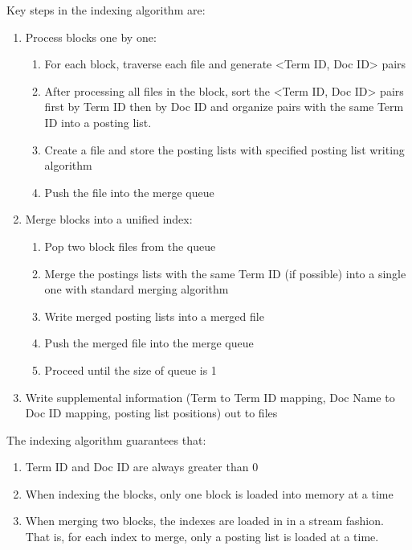\documentclass{article}
\newenvironment{enumeratenumeric}{\begin{enumerate}[1.] }{\end{enumerate}}
\begin{document}
Key steps in the indexing algorithm are:
\begin{enumeratenumeric}
  \item Process blocks one by one:
  \begin{enumeratenumeric}
    \item For each block, traverse each file and generate <Term ID, Doc ID>
    pairs
    
    \item After processing all files in the block, sort the <Term ID, Doc ID>
    pairs first by Term ID then by Doc ID and organize pairs with the same
    Term ID into a posting list.
    
    \item Create a file and store the posting lists with specified posting
    list writing algorithm
    
    \item Push the file into the merge queue
  \end{enumeratenumeric}
  \item Merge blocks into a unified index:
  \begin{enumeratenumeric}
    \item Pop two block files from the queue
    
    \item Merge the postings lists with the same Term ID (if possible) into a
    single one with standard merging algorithm
    
    \item Write merged posting lists into a merged file
    
    \item Push the merged file into the merge queue
    
    \item Proceed until the size of queue is 1
  \end{enumeratenumeric}
  \item Write supplemental information (Term to Term ID mapping, Doc Name to
  Doc ID mapping, posting list positions) out to files
\end{enumeratenumeric}
The indexing algorithm guarantees that:
\begin{enumeratenumeric}
  \item Term ID and Doc ID are always greater than 0
  
  \item When indexing the blocks, only one block is loaded into memory at a
  time
  
  \item When merging two blocks, the indexes are loaded in in a stream
  fashion. That is, for each index to merge, only a posting list is loaded at
  a time.
\end{enumeratenumeric}
\end{document}
